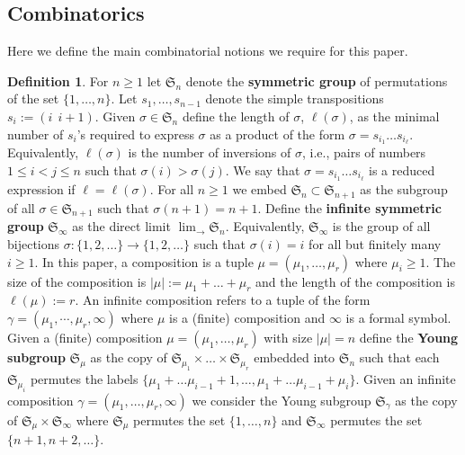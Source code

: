 \documentclass[12pt,reqno]{amsart}
\theoremstyle{definition}
\newtheorem{defn}[thm]{Definition}
\begin{document}
\subsection{Combinatorics}

Here we define the main combinatorial notions we require for this paper.

\begin{defn}
    For $n \geq 1$ let $\mathfrak{S}_n$ denote the \textbf{symmetric group} of permutations of the set $\{1,\dots,n\}.$ Let $s_1,\dots,s_{n-1}$ denote the simple transpositions $s_{i}:=(i~~i+1).$ Given $\sigma \in \mathfrak{S}_n$ define the length of $\sigma$, $\ell(\sigma)$, as the minimal number of $s_i$'s required to express $\sigma$ as a product of the form $\sigma = s_{i_1}\dots s_{i_{\ell}}.$ Equivalently, $\ell(\sigma)$ is the number of inversions of $\sigma$, i.e., pairs of numbers $1\leq i< j\leq n $ such that $\sigma(i) > \sigma(j).$ We say that $\sigma = s_{i_1}\dots s_{i_{\ell}}$ is a reduced expression if $\ell = \ell(\sigma).$ For all $n \geq 1$ we embed $\mathfrak{S}_n \subset \mathfrak{S}_{n+1}$ as the subgroup of all $\sigma \in \mathfrak{S}_{n+1}$ such that $\sigma(n+1) = n+1.$ Define the \textbf{infinite symmetric group} $\mathfrak{S}_{\infty}$ as the direct limit $\lim_{\rightarrow} \mathfrak{S}_n.$ Equivalently, $\mathfrak{S}_{\infty}$ is the group of all bijections $\sigma: \{1,2,\dots\} \rightarrow \{1,2,\ldots\}$ such that $\sigma(i) = i$ for all but finitely many $i\geq 1.$ In this paper, a composition is a tuple $\mu = (\mu_1,\dots,\mu_r)$ where $\mu_i \geq 1.$ The size of the composition is $|\mu|:= \mu_1+\dots+\mu_r$ and the length of the composition is $\ell(\mu):= r.$ An infinite composition refers to a tuple of the form $\gamma = (\mu_1,\cdots,\mu_r,\infty)$ where $\mu$ is a (finite) composition and $\infty$ is a formal symbol. Given a (finite) composition $\mu = (\mu_1,\dots,\mu_r)$ with size $|\mu| = n$ define the \textbf{Young subgroup} $\mathfrak{S}_{\mu}$ as the copy of $\mathfrak{S}_{\mu_1}\times \dots \times \mathfrak{S}_{\mu_r}$ embedded into $\mathfrak{S}_n$ such that each $\mathfrak{S}_{\mu_i}$ permutes the labels $\{\mu_1+\dots\mu_{i-1}+1,\dots,\mu_1+\dots\mu_{i-1}+\mu_i\}.$ Given an infinite composition $\gamma = (\mu_1,\dots,\mu_r,\infty)$ we consider the Young subgroup $\mathfrak{S}_{\gamma}$ as the copy of $\mathfrak{S}_{\mu}\times \mathfrak{S}_{\infty}$ where $\mathfrak{S}_{\mu}$ permutes the set $\{1,\dots,n\}$ and $\mathfrak{S}_{\infty}$ permutes the set $\{n+1,n+2,\dots\}.$
\end{defn}
\end{document}
